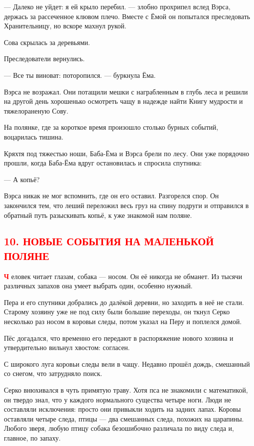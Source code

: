 \documentclass[oneside,final,14pt]{extreport}
\begin{document}
	— Далеко не уйдет: я ей крыло перебил. — злобно прохрипел вслед Вэрса, держась за рассеченное клювом плечо. Вместе с Ёмой он попытался преследовать Хранительницу, но вскоре махнул рукой.
	
	Сова скрылась за деревьями.
	
	Преследователи вернулись.
	
	— Все ты виноват: поторопился. — буркнула Ёма.
	
	Вэрса не возражал. Они потащили мешки с награбленным в глубь леса и решили на другой день хорошенько осмотреть чащу в надежде найти Книгу мудрости и тяжелораненую Сову.
	
	На полянке, где за короткое время произошло столько бурных событий, воцарилась тишина.
	
	Кряхтя под тяжестью ноши, Баба-Ёма и Вэрса брели по лесу. Они уже порядочно прошли, когда Баба-Ёма вдруг остановилась и спросила спутника:
	
	— А копьё?
	
	Вэрса никак не мог вспомнить, где он его оставил. Разгорелся спор. Он закончился тем, что леший переложил весь груз на спину подруги и отправился в обратный путь разыскивать копьё, к уже знакомой нам поляне.
	
		{%
		\centering
		\subsection*{\textcolor{red}{10. НОВЫЕ СОБЫТИЯ НА МАЛЕНЬКОЙ ПОЛЯНЕ}}
	}
	
	\lettrine[findent=0pt]{\textbf{\textcolor{red}{Ч}}}{} еловек читает глазам, собака — носом. Он её никогда не обманет. Из тысячи различных запахов она умеет выбрать один, особенно нужный.
	
	Пера и его спутники добрались до далёкой деревни, но заходить в неё не стали. Старому хозяину уже не под силу были большие переходы, он ткнул Серко несколько раз носом в коровьи следы, потом указал на Перу и поплелся домой.
	
	Пёс догадался, что временно его передают в распоряжение нового хозяина и утвердительно вильнул хвостом: согласен.
	
	С широкого луга коровьи следы вели в чащу. Недавно прошёл дождь, смешанный со снегом, что затрудняло поиск.
	
	Серко внюхивался в чуть примятую траву. Хотя пса не знакомили с математикой, он твердо знал, что у каждого нормального существа четыре ноги. Люди не составляли исключения: просто они привыкли ходить на задних лапах. Коровы оставляли четыре следа, птицы — два смешанных следа, похожих на царапины. Любого зверя, любую птицу собака безошибочно различала по виду следа и, главное, по запаху.
	
\end{document}
